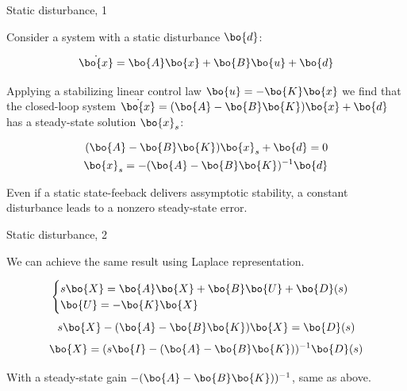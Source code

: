 \documentclass{beamer}
\begin{document}
\begin{frame}{Static disturbance, 1}
	\begin{flushleft}
		
		Consider a system with a static disturbance $\bo{d}$:
		
		\begin{equation}
				\dot {\bo{x}} = \bo{A} \bo{x} + \bo{B} \bo{u} + \bo{d}
		\end{equation}
		
		Applying a stabilizing linear control law $\bo{u} = -\bo{K}\bo{x}$ we find that the closed-loop system $\dot {\bo{x}} =( \bo{A} -  \bo{B}  \bo{K}  )\bo{x} + \bo{d}$ has a steady-state solution $\bo{x}_s$:
		
		\begin{align}
			( \bo{A} -  \bo{B}  \bo{K}  )\bo{x}_s + \bo{d} = 0
			\\
			\bo{x}_s = -( \bo{A} -  \bo{B}  \bo{K}  )^{-1} \bo{d}
		\end{align}
		
		Even if a static state-feeback delivers assymptotic stability, a constant disturbance leads to a nonzero steady-state error.
		
	\end{flushleft}
\end{frame}


\begin{frame}{Static disturbance, 2}
	\begin{flushleft}
		
		We can achieve the same result using Laplace representation. 
		
		\begin{equation}
			\begin{cases}
				s \bo{X} = \bo{A} \bo{X} + \bo{B} \bo{U} + \bo{D}(s) \\
				\bo{U} = -\bo{K}\bo{X}
			\end{cases}
		\end{equation}
		\begin{equation}
			s \bo{X} -( \bo{A} - \bo{B} \bo{K})\bo{X} =\bo{D}(s)
		\end{equation}
		\begin{equation}
		\bo{X} =(s \bo{I} -( \bo{A} - \bo{B} \bo{K}))^{-1} \bo{D}(s)
		\end{equation}
		
		With a steady-state gain $-( \bo{A} - \bo{B} \bo{K}))^{-1}$, same as above.
		
		
	\end{flushleft}
\end{frame}
\end{document}
